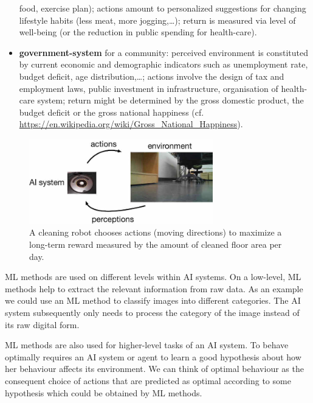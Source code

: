 \documentclass[12pt]{report}
\begin{document}
\begin{itemize}
food, exercise plan);  actions amount to personalized suggestions 
for changing lifestyle habits (less meat, more jogging,\ldots); return 
is measured via level of well-being (or the reduction in public 
spending for health-care).  
\item {\bf government-system} for a community: perceived environment 
is constituted by current economic and demographic indicators such as 
unemployment rate, budget deficit, age distribution,\ldots; actions involve 
the design of tax and employment laws, public investment in infrastructure, 
organisation of health-care system; return might be determined by the 
gross domestic product, the budget deficit or the gross national 
happiness (cf. \url{https://en.wikipedia.org/wiki/Gross_National_Happiness}). 
\end{itemize}
	\vspace*{2mm}
\begin{figure}[htbp]
	\begin{center}
		\includegraphics[width=8cm]{AIsystemEnvML1.jpg}  
		\caption{A cleaning robot chooses actions (moving directions) to maximize 
			a long-term reward measured by the amount of cleaned floor area per day.}
		\label{fig:cleaning_robot}
	\end{center}
\end{figure}

ML methods are used on different levels within AI systems. On a low-level, ML methods 
help to extract the relevant information from raw data. As an example we could use an 
ML method to classify images into different categories. The AI system subsequently 
only needs to process the category of the image instead of its raw digital form. 

ML methods are also used for higher-level tasks of an AI system. To behave optimally 
requires an AI system or agent to learn a good hypothesis about how her behaviour 
affects its environment. We can think of optimal behaviour as the consequent choice 
of actions that are predicted as optimal according to some hypothesis which could 
be obtained by ML methods. 

\end{document}
